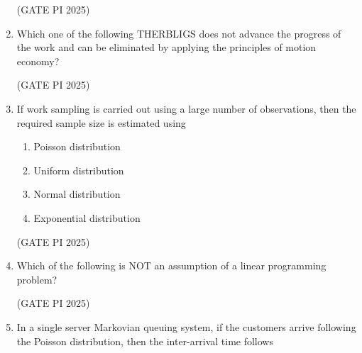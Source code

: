 \documentclass[journal,12pt,onecolumn]{IEEEtran}
\theoremstyle{remark}
\begin{document}
\begin{enumerate}
\hfill (GATE PI 2025)

\item Which one of the following THERBLIGS does not advance the progress of the work and can be eliminated by applying the principles of motion economy?

\begin{enumerate}
\end{enumerate}

\hfill (GATE PI 2025)

\item If work sampling is carried out using a large number of observations, then the required sample size is estimated using

\begin{multicols}{2}
\begin{enumerate}
    \item Poisson distribution
    \item Uniform distribution
    \item Normal distribution
    \item Exponential distribution
\end{enumerate}
\end{multicols}

\hfill (GATE PI 2025)

\item Which of the following is NOT an assumption of a linear programming problem?

\begin{enumerate}
\end{enumerate}

\hfill (GATE PI 2025)

\item In a single server Markovian queuing system, if the customers arrive following the Poisson distribution, then the inter-arrival time follows


\end{enumerate}
\end{document}
